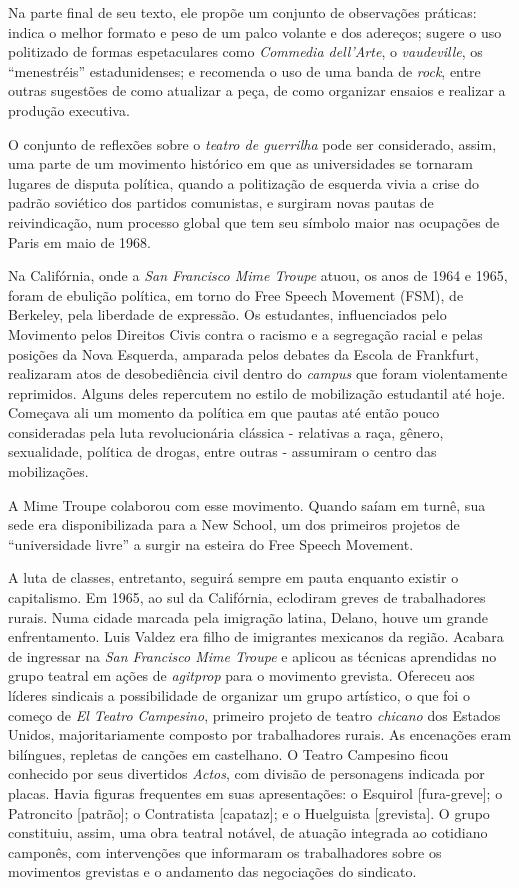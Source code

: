 Na parte final de seu texto, ele propõe um conjunto de observações
práticas: indica o melhor formato e peso de um palco volante e dos
adereços; sugere o uso politizado de formas espetaculares como
\textit{Commedia dell'Arte}, o \textit{vaudeville}, os “menestréis”
estadunidenses; e recomenda o uso de uma banda de \textit{rock}, entre
outras sugestões de como atualizar a peça, de como organizar ensaios e
realizar a produção executiva.

O conjunto de reflexões sobre o \textit{teatro de guerrilha} pode ser
considerado, assim, uma parte de um movimento histórico em que as
universidades se tornaram lugares de disputa política, quando a
politização de esquerda vivia a crise do padrão soviético dos partidos
comunistas, e surgiram novas pautas de reivindicação, num processo
global que tem seu símbolo maior nas ocupações de Paris em maio de 1968.

Na Califórnia, onde a \textit{San Francisco Mime Troupe} atuou, os anos de
1964 e 1965, foram de ebulição política, em torno do Free Speech
Movement (FSM), de Berkeley, pela liberdade de expressão. Os estudantes,
influenciados pelo Movimento pelos Direitos Civis contra o racismo e a
segregação racial e pelas posições da Nova Esquerda, amparada pelos
debates da Escola de Frankfurt, realizaram atos de desobediência civil
dentro do \textit{campus} que foram violentamente reprimidos. Alguns deles
repercutem no estilo de mobilização estudantil até hoje. Começava ali um
momento da política em que pautas até então pouco consideradas pela luta
revolucionária clássica - relativas a raça, gênero, sexualidade,
política de drogas, entre outras - assumiram o centro das mobilizações.

A Mime Troupe colaborou com esse movimento. Quando saíam em turnê, sua
sede era disponibilizada para a New School, um dos primeiros projetos de
“universidade livre” a surgir na esteira do Free Speech Movement.

A luta de classes, entretanto, seguirá sempre em pauta enquanto existir
o capitalismo. Em 1965, ao sul da Califórnia, eclodiram greves de
trabalhadores rurais. Numa cidade marcada pela imigração latina, Delano,
houve um grande enfrentamento. Luis Valdez era filho de imigrantes
mexicanos da região. Acabara de ingressar na \textit{San Francisco Mime
Troupe} e aplicou as técnicas aprendidas no grupo teatral em ações de
\textit{agitprop} para o movimento grevista. Ofereceu aos líderes sindicais
a possibilidade de organizar um grupo artístico, o que foi o começo de
\textit{El Teatro Campesino}, primeiro projeto de teatro \textit{chicano} dos
Estados Unidos, majoritariamente composto por trabalhadores rurais. As
encenações eram bilíngues, repletas de canções em castelhano. O Teatro
Campesino ficou conhecido por seus divertidos \textit{Actos}, com divisão
de personagens indicada por placas. Havia figuras frequentes em suas
apresentações: o Esquirol {[}fura-greve{]}; o Patroncito {[}patrão{]}; o
Contratista {[}capataz{]}; e o Huelguista {[}grevista{]}. O grupo
constituiu, assim, uma obra teatral notável, de atuação integrada ao
cotidiano camponês, com intervenções que informaram os trabalhadores
sobre os movimentos grevistas e o andamento das negociações do
sindicato.

